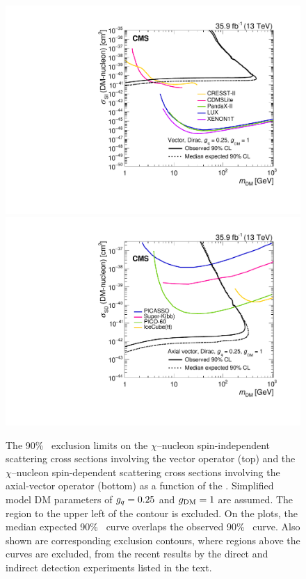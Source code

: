 \begin{figure}[htbp]
  \centering
    \includegraphics[width=0.45\textheight]{Impact/Figures/limits_direct.pdf}
    \includegraphics[width=0.45\textheight]{Impact/Figures/limits_indirect.pdf}
    \caption{
      The 90\% \CL\ exclusion limits on the $\chi$--nucleon spin-independent scattering cross sections involving the vector operator (top) and the $\chi$--nucleon spin-dependent scattering cross sections involving the axial-vector operator (bottom) as a function of the \mdm.
      Simplified model DM parameters of $g_{{q}}=0.25$ and $g_{\text{DM}}=1$ are assumed.
      The region to the upper left of the contour is excluded. 
      On the plots, the median expected 90\% \CL\ curve overlaps the observed 90\% \CL\ curve.
      Also shown are corresponding exclusion contours, where regions above the curves are excluded, from the recent results by the direct and indirect detection experiments listed in the text.
    }
    \label{fig:limits_direct}
\end{figure}

